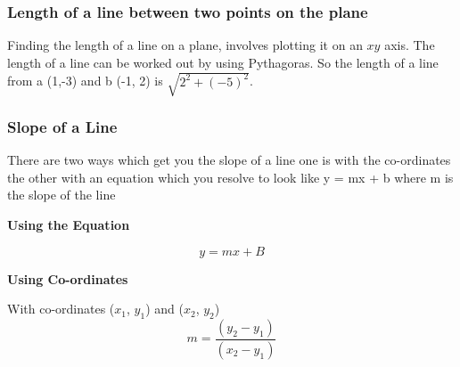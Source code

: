 \documentclass{article}
\begin{document}
\subsubsection{Length of a line between two points on the plane}
Finding the length of a line on a plane, involves plotting it on an $x y $ axis. The length of a line can be worked out by using Pythagoras. So the length of a line from a (1,-3) and b (-1, 2) is $ \sqrt{2^{2} + (-5)^{2}}$.
 
 
\newpage
\subsubsection{Slope of a Line}
There are two ways which get you the slope of a line one is with the co-ordinates the other with an equation which you resolve to look like y = mx + b where m is the slope of the line

\textbf{Using the Equation}

\begin{equation}
y = mx + B
\end{equation}

\textbf{Using Co-ordinates}

With co-ordinates ($x_1$, $y_1$) and ($x_2$, $y_2$) 
\begin{equation}
m = \frac{ (y_2 - y_1) }{ (x_2 - y_1) }
\end{equation}
\end{document}
